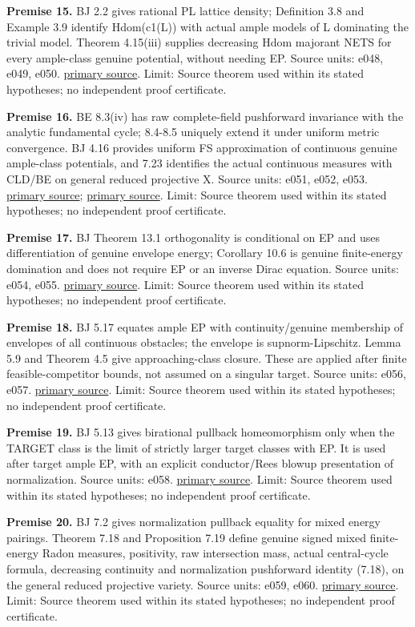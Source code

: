 \documentclass[
  10pt,
]{article}
\begin{document}
\textbf{Premise 15.} BJ 2.2 gives rational PL lattice density;
Definition 3.8 and Example 3.9 identify Hdom(c1(L)) with actual ample
models of L dominating the trivial model. Theorem 4.15(iii) supplies
decreasing Hdom majorant NETS for every ample-class genuine potential,
without needing EP. Source units: e048, e049, e050.
\href{https://arxiv.org/pdf/1801.08229v4}{primary source}. Limit: Source
theorem used within its stated hypotheses; no independent proof
certificate.

\textbf{Premise 16.} BE 8.3(iv) has raw complete-field pushforward
invariance with the analytic fundamental cycle; 8.4-8.5 uniquely extend
it under uniform metric convergence. BJ 4.16 provides uniform FS
approximation of continuous genuine ample-class potentials, and 7.23
identifies the actual continuous measures with CLD/BE on general reduced
projective X. Source units: e051, e052, e053.
\href{https://arxiv.org/pdf/1805.01016v3}{primary source};
\href{https://arxiv.org/pdf/1801.08229v4}{primary source}. Limit: Source
theorem used within its stated hypotheses; no independent proof
certificate.

\textbf{Premise 17.} BJ Theorem 13.1 orthogonality is conditional on EP
and uses differentiation of genuine envelope energy; Corollary 10.6 is
genuine finite-energy domination and does not require EP or an inverse
Dirac equation. Source units: e054, e055.
\href{https://arxiv.org/pdf/1801.08229v4}{primary source}. Limit: Source
theorem used within its stated hypotheses; no independent proof
certificate.

\textbf{Premise 18.} BJ 5.17 equates ample EP with continuity/genuine
membership of envelopes of all continuous obstacles; the envelope is
supnorm-Lipschitz. Lemma 5.9 and Theorem 4.5 give approaching-class
closure. These are applied after finite feasible-competitor bounds, not
assumed on a singular target. Source units: e056, e057.
\href{https://arxiv.org/pdf/1801.08229v4}{primary source}. Limit: Source
theorem used within its stated hypotheses; no independent proof
certificate.

\textbf{Premise 19.} BJ 5.13 gives birational pullback homeomorphism
only when the TARGET class is the limit of strictly larger target
classes with EP. It is used after target ample EP, with an explicit
conductor/Rees blowup presentation of normalization. Source units: e058.
\href{https://arxiv.org/pdf/1801.08229v4}{primary source}. Limit: Source
theorem used within its stated hypotheses; no independent proof
certificate.

\textbf{Premise 20.} BJ 7.2 gives normalization pullback equality for
mixed energy pairings. Theorem 7.18 and Proposition 7.19 define genuine
signed mixed finite-energy Radon measures, positivity, raw intersection
mass, actual central-cycle formula, decreasing continuity and
normalization pushforward identity (7.18), on the general reduced
projective variety. Source units: e059, e060.
\href{https://arxiv.org/pdf/1801.08229v4}{primary source}. Limit: Source
theorem used within its stated hypotheses; no independent proof
certificate.
\end{document}
